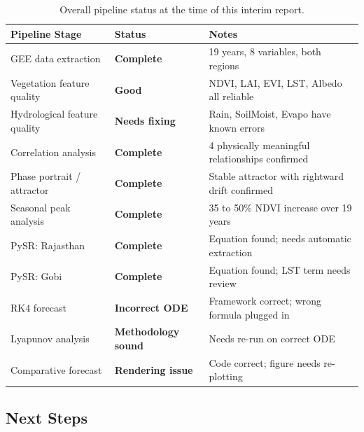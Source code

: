 \documentclass[12pt, a4paper]{article}
\begin{document}
\begin{table}[H]
\centering
\caption{Overall pipeline status at the time of this interim report.}
\label{tab:status}
\begin{tabularx}{\textwidth}{p{4.2cm} p{2.8cm} X}
\toprule
\textbf{Pipeline Stage} & \textbf{Status} & \textbf{Notes} \\
\midrule
GEE data extraction &
    \textcolor{notegreen}{\textbf{Complete}} &
    19 years, 8 variables, both regions \\[3pt]
Vegetation feature quality &
    \textcolor{notegreen}{\textbf{Good}} &
    NDVI, LAI, EVI, LST, Albedo all reliable \\[3pt]
Hydrological feature quality &
    \textcolor{warnred}{\textbf{Needs fixing}} &
    Rain, SoilMoist, Evapo have known errors \\[3pt]
Correlation analysis &
    \textcolor{notegreen}{\textbf{Complete}} &
    4 physically meaningful relationships confirmed \\[3pt]
Phase portrait / attractor &
    \textcolor{notegreen}{\textbf{Complete}} &
    Stable attractor with rightward drift confirmed \\[3pt]
Seasonal peak analysis &
    \textcolor{notegreen}{\textbf{Complete}} &
    35 to 50\% NDVI increase over 19 years \\[3pt]
PySR: Rajasthan &
    \textcolor{notegreen}{\textbf{Complete}} &
    Equation found; needs automatic extraction \\[3pt]
PySR: Gobi &
    \textcolor{notegreen}{\textbf{Complete}} &
    Equation found; LST term needs review \\[3pt]
RK4 forecast &
    \textcolor{warnred}{\textbf{Incorrect ODE}} &
    Framework correct; wrong formula plugged in \\[3pt]
Lyapunov analysis &
    \textcolor{notegreen}{\textbf{Methodology sound}} &
    Needs re-run on correct ODE \\[3pt]
Comparative forecast &
    \textcolor{warnred}{\textbf{Rendering issue}} &
    Code correct; figure needs re-plotting \\
\bottomrule
\end{tabularx}
\end{table}

\subsection{Next Steps}
\end{document}
